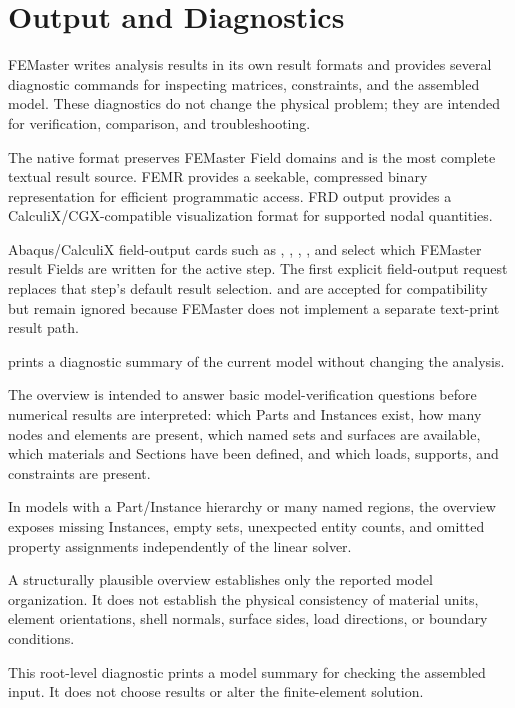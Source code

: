 \section{Output and Diagnostics}
\label{sec:output-results}

FEMaster writes analysis results in its own result formats and provides several diagnostic commands for inspecting matrices, constraints, and the assembled model. These diagnostics do not change the physical problem; they are intended for verification, comparison, and troubleshooting.

The native  format preserves FEMaster Field domains and is the most complete textual result source. FEMR provides a seekable, compressed binary representation for efficient programmatic access. FRD output provides a CalculiX/CGX-compatible visualization format for supported nodal quantities.

Abaqus/CalculiX field-output cards such as , , , , and  select which FEMaster result Fields are written for the active step. The first explicit field-output request replaces that step's default result selection.  and  are accepted for compatibility but remain ignored because FEMaster does not implement a separate text-print result path.


 prints a diagnostic summary of the current model without changing the analysis.

The overview is intended to answer basic model-verification questions before numerical results are interpreted: which Parts and Instances exist, how many nodes and elements are present, which named sets and surfaces are available, which materials and Sections have been defined, and which loads, supports, and constraints are present.

In models with a Part/Instance hierarchy or many named regions, the overview exposes missing Instances, empty sets, unexpected entity counts, and omitted property assignments independently of the linear solver.

A structurally plausible overview establishes only the reported model organization. It does not establish the physical consistency of material units, element orientations, shell normals, surface sides, load directions, or boundary conditions.

This root-level diagnostic prints a model summary for checking the assembled input. It does not choose results or alter the finite-element solution.

